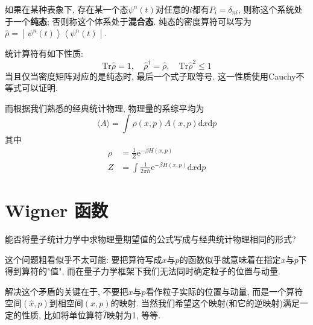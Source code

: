        如果在某种表象下, 存在某一个态$\psi^{n}(t)$对任意的$i$都有$P_i = \delta_{ni}$, 则称这个系统处于一个\textbf{纯态}; 否则称这个体系处于\textbf{混合态}.
        纯态的密度算符可以写为$\hat{\rho} = \left. \middle| {\psi^{n}(t)} \right\rangle \left\langle {\psi^{n}(t)} \middle| \right.$. 

        统计算符有如下性质:
        \begin{equation}
            \mathrm{Tr}\hat\rho = 1, \quad
            \hat\rho^{\dagger} = \hat\rho, \quad
            \mathrm{Tr}\hat\rho^{2} \leq 1
        \end{equation}
        当且仅当密度矩阵对应的是纯态时, 最后一个式子取等号. 这一性质使用Cauchy不等式可以证明. 

        \splitline

        而根据我们熟悉的经典统计物理, 物理量的系综平均为
        \begin{equation}
            \langle A \rangle = \int \rho(x,p) A(x,p) \mathrm{d}x\mathrm{d}p
        \end{equation}
        其中
        \begin{equation}\begin{aligned}
            \rho &= \frac 1Z \mathrm{e}^{-\beta H(x,p)}\\
            Z &= \int \frac 1{2\pi \hbar} \mathrm{e}^{-\beta H(x,p)} \mathrm{d}x \mathrm{d}p
        \end{aligned}\end{equation}

    \section{Wigner 函数}

        能否将量子统计力学中求物理量期望值的公式写成与经典统计物理相同的形式?

        这个问题粗看似乎不太可能: 要把算符写成$x$与$p$的函数似乎就意味着在指定$x$与$p$下得到算符的"值", 而在量子力学框架下我们无法同时确定粒子的位置与动量.

        解决这个矛盾的关键在于, 不要把$x$与$p$看作粒子实际的位置与动量, 而是一个算符空间$(\hat x, \hat p)$到相空间$(x, p)$的映射. 当然我们希望这个映射(和它的逆映射)满足一定的性质, 比如将单位算符$\hat I$映射为1, 等等.

